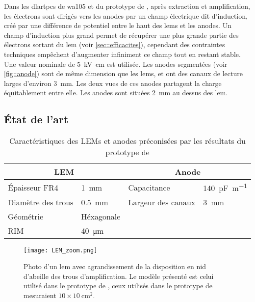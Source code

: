       Dans les \glspl{dlartpc} de \gls{wa105} et du prototype de \threeL{}, après extraction et amplification, les électrons sont dirigés vers les anodes par un champ électrique dit d'induction, créé par une différence de potentiel entre le haut des \glspl{lem} et les anodes. Un champ d'induction plus grand permet de récupérer une plus grande partie des électrons sortant du \gls{lem} (voir \autoref{sec::efficacites}), cependant des contraintes techniques empêchent d'augmenter infiniment ce champ tout en restant stable. Une valeur nominale de \SI{5}{\kilo\volt\centi\meter} est utilisée. Les anodes segmentées (voir \autoref{fig::anode}) sont de même dimension que les \glspl{lem}, et ont des canaux de lecture larges d'environ \SI{3}{\milli\meter}. Les deux vues de ces anodes partagent la charge équitablement entre elle. Les anodes sont situées \SI{2}{\milli\meter} au dessus des \gls{lem}.

    \subsection{État de l'art}\label{sec::state_of_the_art}

      \begin{table}[]
        \centering
        \begin{tabular}{|ll||ll|}
          \hline
          \multicolumn{2}{|c||}{LEM} & \multicolumn{2}{c|}{Anode} \\ \hline \hline
          Épaisseur FR4 & \SI{1}{\milli\meter} & Capacitance & \SI{140}{\pico\farad\per\meter} \\
          Diamètre des trous & \SI{0.5}{\milli\meter} & Largeur des canaux & \SI{3}{\milli\meter} \\
          Géométrie & Héxagonale &  &  \\
          RIM & \SI{40}{\micro\meter} &  &  \\ \hline
        \end{tabular}
        \caption[Caractéristiques des LEMs et anodes utilisé dans le \threeL{}]{\label{tab::lem_anode}Caractéristiques des LEMs et anodes préconisées par les résultats du prototype de \threeL{}}
      \end{table}

      \begin{figure}[htbp]
        \begin{center}\texttt{[image: LEM\_zoom.png]}\end{center}
        \caption[Photo d'un amplificateur d'électron.]{Photo d'un \gls{lem} avec agrandissement de la disposition en nid d'abeille des trous d'amplification. Le modèle présenté est celui utilisé dans le prototype de \TOO{}, ceux utilisés dans le prototype de \threeL{} mesuraient $10\times\SI{10}{\centi\meter\squared}$.}
        \label{fig::lem}
      \end{figure}

